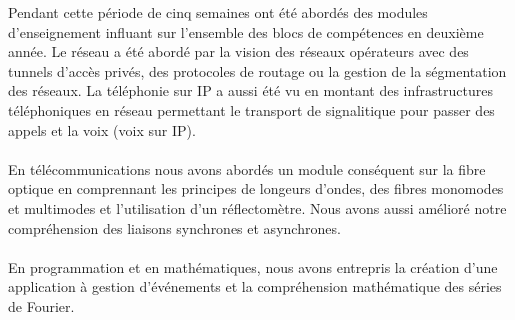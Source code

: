 \begin{resumo}
    Pendant cette période de cinq semaines ont été abordés des modules d'enseignement influant sur l'ensemble des blocs de compétences en deuxième année. Le réseau a été abordé par la vision des réseaux opérateurs avec des tunnels d'accès privés, des protocoles de routage ou la gestion de la ségmentation des réseaux. La téléphonie sur IP a aussi été vu en montant des infrastructures téléphoniques en réseau permettant le transport de signalitique pour passer des appels et la voix (voix sur IP).
    \\ \\
    En télécommunications nous avons abordés un module conséquent sur la fibre optique en comprennant les principes de longeurs d'ondes, des fibres monomodes et multimodes et l'utilisation d'un réflectomètre. Nous avons aussi amélioré notre compréhension des liaisons synchrones et asynchrones.
    \\ \\
    En programmation et en mathématiques, nous avons entrepris la création d'une application à gestion d'événements et la compréhension mathématique des séries de Fourier.
    
    \end{resumo}